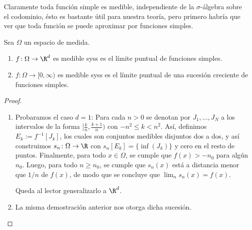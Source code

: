 Claramente toda función simple es medible, independiente de la $\sigma$-álgebra sobre el codominio, ésto es bastante útil para nuestra teoría,
pero primero habría que ver que toda función se puede aproximar por funciones simples.
\begin{thm}\label{thm:measurable_is_simple_limit}
	Sea $\Omega$ un espacio de medida.
	\begin{enumerate}
		\item $f\colon \Omega \to \R^d$ es medible syss es el límite puntual de funciones simples.
		\item $f\colon \Omega \to [0, \infty)$ es medible syss es el límite puntual de una sucesión creciente de funciones simples.
	\end{enumerate}
\end{thm}
\begin{proof}
	\begin{enumerate}
		\item Probaramos el caso $d = 1$:
			Para cada $n > 0$ se denotan por $J_1, \dots, J_N$ a los intervalos de la forma $[ \frac{k}{n}, \frac{k+1}{n})$
			con $-n^2 \le k < n^2$. Así, definimos $E_k := f^{-1}[J_k]$, los cuales son conjuntos medibles disjuntos dos a dos,
			y así construimos $s_n\colon\Omega \to \R$ con $s_n[E_k] = \{ \inf(J_k) \}$ y cero en el resto de puntos.
			Finalmente, para todo $x \in \Omega$, se cumple que $f(x) > -n_0$ para algún $n_0$.
			Luego, para todo $n \ge n_0$, se cumple que $s_n(x)$ está a distancia menor que $1/n$ de $f(x)$, de modo que
			se concluye que $\lim_n s_n(x) = f(x)$.
			\par
			Queda al lector generalizarlo a $\R^d$.

		\item La misma demostración anterior nos otorga dicha sucesión. \qedhere
	\end{enumerate}
\end{proof}

